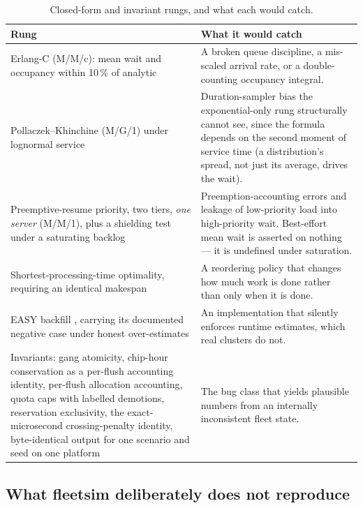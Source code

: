 \begin{table}[t]
\centering\small
\caption{Closed-form and invariant rungs, and what each would catch.}
\label{tab:rungs}
\begin{tabular}{p{}p{}}
\toprule
Rung & What it would catch \\
\midrule
Erlang-C (M/M/c): mean wait and occupancy within 10\,\% of analytic &
A broken queue discipline, a mis-scaled arrival rate, or a double-counting
occupancy integral. \\
Pollaczek--Khinchine (M/G/1) under lognormal service &
Duration-sampler bias the exponential-only rung structurally cannot see, since
the formula depends on the second moment of service time (a distribution's
spread, not just its average, drives the wait). \\
Preemptive-resume priority, two tiers, \emph{one server} (M/M/1), plus a
shielding test under a saturating backlog &
Preemption-accounting errors and leakage of low-priority load into
high-priority wait. Best-effort mean wait is asserted on nothing --- it is
undefined under saturation. \\
Shortest-processing-time optimality, requiring an identical makespan &
A reordering policy that changes how much work is done rather than only when it
is done. \\
EASY backfill \cite{easybackfill1995}, carrying its documented negative case
under honest over-estimates &
An implementation that silently enforces runtime estimates, which real clusters
do not. \\
Invariants: gang atomicity, chip-hour conservation as a per-flush accounting
identity, per-flush allocation
accounting, quota caps with labelled demotions, reservation exclusivity, the
exact-microsecond crossing-penalty identity, byte-identical output for one
scenario and seed on one platform &
The bug class that yields plausible numbers from an internally inconsistent
fleet state. \\
\bottomrule
\end{tabular}
\end{table}

\subsection{What fleetsim deliberately does not reproduce}
\label{sec:anti-goals}

